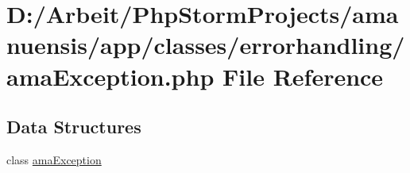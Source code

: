 \hypertarget{a00091}{}\section{D\+:/\+Arbeit/\+Php\+Storm\+Projects/amanuensis/app/classes/errorhandling/ama\+Exception.php File Reference}
\label{a00091}
\subsection*{Data Structures}
\begin{DoxyCompactItemize}
\item 
class \hyperlink{a00003}{ama\+Exception}
\end{DoxyCompactItemize}
